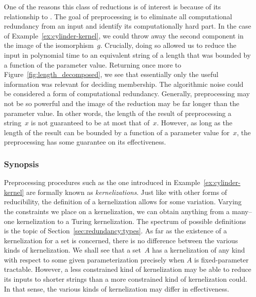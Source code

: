 One of the reasons this class of reductions is of interest is because of its relationship to .
The goal of preprocessing is to eliminate all computational redundancy from an input and identify its computationally hard part.
In the case of Example~\ref{ex:cylinder-kernel}, we could throw away the second component in the image of the isomorphism~$g$.
Crucially, doing so allowed us to reduce the input in polynomial time to an equivalent string of a length that was bounded by a function of the parameter value.
Returning once more to Figure~\ref{fig:length_decomposed}, we see that essentially only the useful information was relevant for deciding membership.
The algorithmic noise could be considered a form of computational redundancy.
Generally, preprocessing may not be so powerful and the image of the reduction may be far longer than the parameter value.
In other words, the length of the result of preprocessing a string~$x$ is not guaranteed to be at most that of~$x$.
However, as long as the length of the result can be bounded by a function of a parameter value for~$x$, the preprocessing has some guarantee on its effectiveness.

\subsubsection{Synopsis}
Preprocessing procedures such as the one introduced in Example~\ref{ex:cylinder-kernel} are formally known as \emph{kernelizations}.
Just like with other forms of reducibility, the definition of a kernelization allows for some variation.
Varying the constraints we place on a kernelization, we can obtain anything from a many--one kernelization to a Turing kernelization.
The spectrum of possible definitions is the topic of Section~\ref{sec:redundancy:types}.
As far as the existence of a kernelization for a set is concerned, there is no difference between the various kinds of kernelization.
We shall see that a set~$A$ has a kernelization of any kind with respect to some given parameterization precisely when $A$ is fixed-parameter tractable.
However, a less constrained kind of kernelization may be able to reduce its inputs to shorter strings than a more constrained kind of kernelization could.
In that sense, the various kinds of kernelization may differ in effectiveness.

